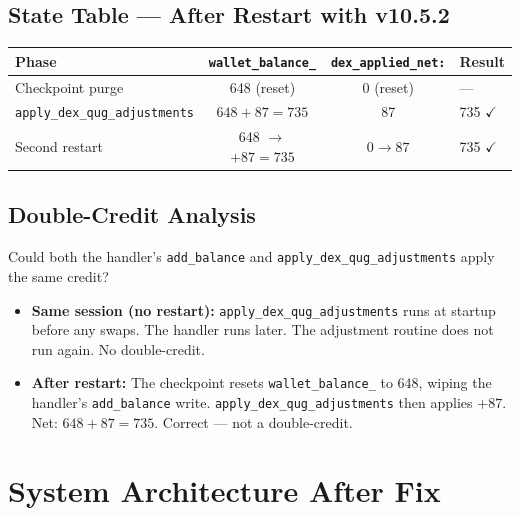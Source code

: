 \documentclass[11pt,a4paper]{article}
\begin{document}
\subsection{State Table — After Restart with v10.5.2}

\begin{center}
\begin{tabular}{lccl}
\toprule
\textbf{Phase} & \textbf{\texttt{wallet\_balance\_}} & \textbf{\texttt{dex\_applied\_net:}} &
  \textbf{Result} \\
\midrule
Checkpoint purge & 648 (reset) & 0 (reset) & — \\
\texttt{apply\_dex\_qug\_adjustments} & $648 + 87 = 735$ & 87 & 735 $\checkmark$ \\
Second restart & 648 $\to$ $+87 = 735$ & $0 \to 87$ & 735 $\checkmark$ \\
\bottomrule
\end{tabular}
\end{center}

\subsection{Double-Credit Analysis}

Could both the handler's \texttt{add\_balance} and
\texttt{apply\_dex\_qug\_adjustments} apply the same credit?

\begin{itemize}
  \item \textbf{Same session (no restart):} \texttt{apply\_dex\_qug\_adjustments}
        runs at startup before any swaps.  The handler runs later.  The adjustment
        routine does not run again.  No double-credit.
  \item \textbf{After restart:} The checkpoint resets
        \texttt{wallet\_balance\_} to 648, wiping the handler's \texttt{add\_balance}
        write.  \texttt{apply\_dex\_qug\_adjustments} then applies $+87$.
        Net: $648 + 87 = 735$.  Correct — not a double-credit.
\end{itemize}

\section{System Architecture After Fix}
\end{document}
